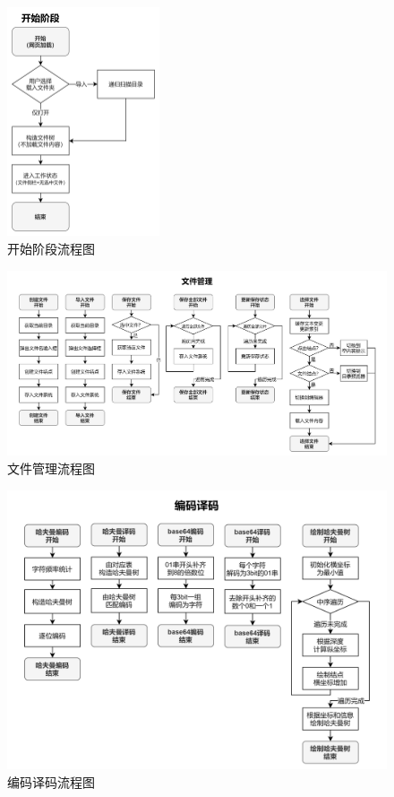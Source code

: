 \documentclass[scheme = chinese]{ctexart}
\begin{document}
\begin{figure}[h]
    \centering
    \includegraphics[width=0.4\textwidth]{images/dsacd-流程图-开始阶段.drawio.png}
    \caption{开始阶段流程图}
\end{figure}

\begin{figure}[h]
    \centering
    \includegraphics[width=\textwidth]{images/dsacd-流程图-文件管理.drawio.png}
    \caption{文件管理流程图}
\end{figure}

\begin{figure}[h]
    \centering
    \includegraphics[width=\textwidth]{images/dsacd-流程图-编码译码.drawio.png}
    \caption{编码译码流程图}
\end{figure}
\end{document}
